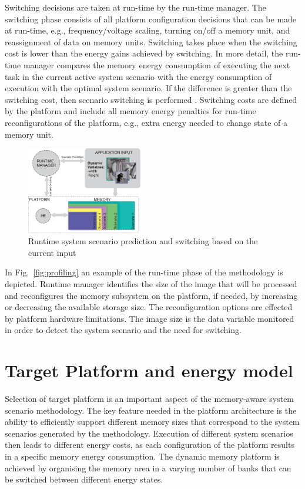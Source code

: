 \documentclass[a4paper,conference]{IEEEtran}
\begin{document}
Switching decisions are taken at run-time by the run-time manager. The switching phase consists of all platform configuration decisions that can be made at run-time, e.g., frequency/voltage scaling, turning on/off a memory unit, and reassignment of data on memory units. Switching takes place when the switching cost is lower than the energy gains achieved by switching. In more detail, the run-time manager compares the memory energy consumption of executing the next task in the current active system scenario with the energy consumption of execution with the optimal system scenario. If the difference is greater than the switching cost, then scenario switching is performed \cite{tcm}. Switching costs are defined by the platform and include all memory energy penalties for run-time reconfigurations of the platform, e.g., extra energy needed to change state of a memory unit.

\begin{figure}[!t]
\centering
\includegraphics[width=0.45\textwidth]{Images/switching.eps}
\caption{Runtime system scenario prediction and switching based on the current input}
\label{fig:runtime}
\end{figure}

In Fig.~\ref{fig:profiling} an example of the run-time phase of the methodology is depicted. Runtime manager identifies the size of the image that will be processed and reconfigures the memory subsystem on the platform, if needed, by increasing or decreasing the available storage size. The reconfiguration options are effected by platform hardware limitations. The image size is the data variable monitored in order to detect the system scenario and the need for switching.

\section{Target Platform and energy model}
\label{sec:platform}

Selection of target platform is an important aspect of the memory-aware system scenario methodology. The key feature needed in the platform architecture is the ability to efficiently support different memory sizes that correspond to the system scenarios generated by the methodology. Execution of different system scenarios then leads to different energy costs, as each configuration of the platform results in a specific memory energy consumption. The dynamic memory platform is achieved by organising the memory area in a varying number of banks that can be switched between different energy states. 
\end{document}

